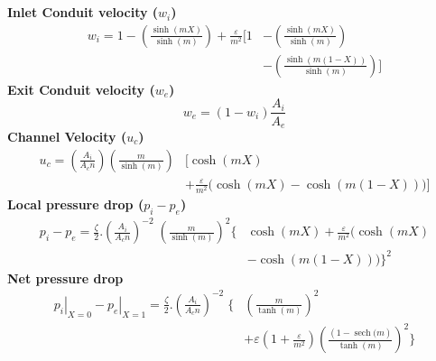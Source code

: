 \documentclass[10pt,a4paper]{article}
\begin{document}
%
\section{ }
\textbf{Inlet Conduit velocity ($w_i$)}
\begin{equation}\label{wi} 	
\begin{split}
{w}_{i}=1-\left( \frac{\sinh (mX)}{\sinh (m)} \right)+\frac{\varepsilon }{{m}^{2}}\Biggl[ 1 & - \left( \frac{\sinh (mX)}{\sinh (m)} \right) \\
& -\left( \frac{\sinh (m(1-X))}{\sinh (m)} \right) \Biggr]
\end{split}
\end{equation}
%
%
\textbf{Exit Conduit velocity ($w_e$)}
\begin{equation}\label{we}
{w}_{e}=\left( 1-{w}_{i} \right)\frac{{A}_{i}}{{A}_{e}}
\end{equation}
%
%
\textbf{Channel Velocity ($u_c$)}
\begin{equation} \label{uc} 
\begin{split}
{{u}_{c}}=\left(\frac{{A}_{i}}{{{A}_{c}}n} \right) \left( \frac{m}{\sinh (m)} \right) &  \Biggl[ \cosh (mX)  \\ 
 & + \frac{\varepsilon }{{m}^{2}}\biggl( \cosh (mX)-\cosh (m(1-X)) \biggr) \Biggr]
\end{split}
\end{equation}
%
%
\textbf{Local pressure drop ($p_i-p_e$)}
\begin{equation} \label{dp} 
\begin{split}
{{p}_{i}}-{{p}_{e}}={\frac{\zeta}{2}}.\left( \frac{{A}_{i}}{{{A}_{c}}n} \right)^{-2}\; {\left( \frac{m}{\sinh (m)} \right)}^{2}\Biggl\{ & \cosh (mX)
+\frac{\varepsilon }{{{m}^{2}}}\biggl( \cosh (mX)\\
& - \cosh (m(1-X)) \biggr) \Biggr\}^{2}
\end{split}
\end{equation}
%
%
\textbf{Net pressure drop}
\begin{equation} \label{netdp} 
\begin{split}
{{\left. {{p}_{i}} \right|}_{X=0}}-{{\left. {{p}_{e}} \right|}_{X=1}}={\frac{\zeta}{2}}.{{{\left( \frac{{{A}_{i}}}{{{A}_{c}}n} \right)}^{-2}}}\; \Biggl\{ & {{\left( \frac{m}{\tanh (m)} \right)}^{2}} \\
& +\varepsilon \left( 1+\frac{\varepsilon }{{{m}^{2}}} \right){{\left( \frac{\left( 1-\operatorname{sech}(m \right)}{\tanh (m)} \right)}^{2}} \Biggr\}  
\end{split}
\end{equation} 
%
\end{document}
